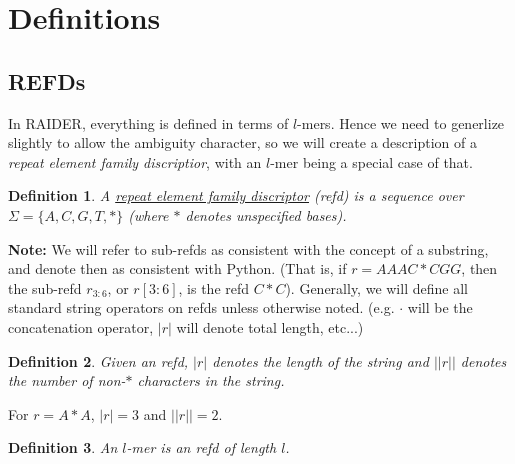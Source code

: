 \documentclass{article}
\newtheorem{definition}{Definition}
\begin{document}
\section{Definitions}

\subsection{REFDs}
In RAIDER, everything is defined in terms of $l$-mers.  Hence we need
to generlize slightly to allow the ambiguity character, so we will
create a description of a {\it repeat element family discriptior},
with an $l$-mer being a special case of that.

\begin{definition}
A \underline{repeat element family discriptor} (refd) is a sequence over
$\Sigma=\{A,C,G,T,*\}$ (where $*$ denotes unspecified bases).
\end{definition}

{\bf Note:} We will refer to sub-refds as consistent with the concept
of a substring, and denote then as consistent with Python.  (That is,
if $r =  AAAC*CGG$, then the sub-refd $r_{3:6}$, or $r[3:6]$, is the refd
$C*C$).  Generally, we will define all standard string operators on
refds unless otherwise noted.  (e.g. $\cdot$ will be the concatenation
operator, $|r|$ will denote total length, etc...)

\begin{definition}
Given an refd, $|r|$ denotes the length of the string and $||r||$
denotes the number of non-$*$ characters in the string.
\end{definition}
For $r = A*A$, $|r| = 3$ and $||r|| = 2$.

\begin{definition}
An $l$-mer is an refd of length $l$.
\end{definition}
\end{document}
